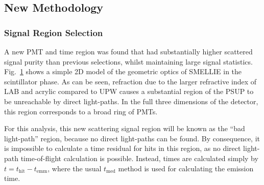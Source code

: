 \subsection{New Methodology}\label{sec:smellie_scatt_new_method}
\subsubsection{Signal Region Selection}
A new PMT and time region was found that had substantially higher scattered signal purity than previous selections, whilst maintaining large signal statistics. Fig.~\ref{fig:smellie_propagation_toy_model} shows a simple 2D model of the geometric optics of SMELLIE in the scintillator phase. As can be seen, refraction due to the larger refractive index of LAB and acrylic compared to UPW causes a substantial region of the PSUP to be unreachable by direct light-paths. In the full three dimensions of the detector, this region corresponds to a broad ring of PMTs.

\begin{figure}
    \centering
    \caption[]{}
    \label{fig:smellie_propagation_toy_model}
\end{figure}

For this analysis, this new scattering signal region will be known as the ``bad light-path'' region, because no direct light-paths can be found. By consequence, it is impossible to calculate a time residual for hits in this region, as no direct light-path time-of-flight calculation is possible. Instead, times are calculated simply by $t = t_{\mathrm{hit}}-t_{\mathrm{emm}}$, where the usual $t_{\mathrm{med}}$ method is used for calculating the emission time.

